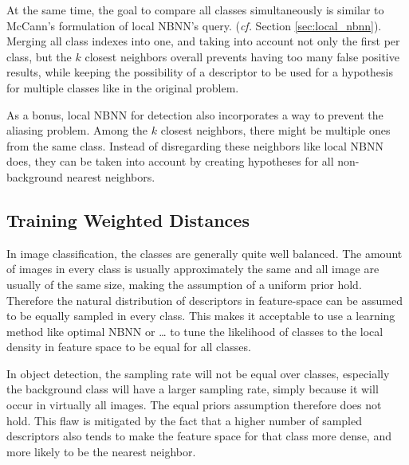 At the same time, the goal to compare all classes simultaneously is similar to McCann's formulation of local NBNN's query.\cite{mccann2012local} (\emph{cf.} Section \ref{sec:local_nbnn}). Merging all class indexes into one, and taking into account not only the first per class, but the $k$ closest neighbors overall prevents having too many false positive results, while keeping the possibility of a descriptor to be used for a hypothesis for multiple classes like in the original problem.

As a bonus, local NBNN for detection also incorporates a way to prevent the aliasing problem. Among the $k$ closest neighbors, there might be multiple ones from the same class. Instead of disregarding these neighbors like local NBNN does, they can be taken into account by creating hypotheses for all non-background nearest neighbors.


\begin{figure}[hbt]
    \centering
\end{figure}


\subsection{Training Weighted Distances} %
\label{sec:training_weighted_distances}

In image classification, the classes are generally quite well balanced. The amount of images in every class is usually approximately the same and all image are usually of the same size, making the assumption of a uniform prior hold. Therefore the natural distribution of descriptors in feature-space can be assumed to be equally sampled in every class. This makes it acceptable to use a learning method like optimal NBNN\cite{behmo2010towards} or \ldots {}\cite{wang2011improved} to tune the likelihood of classes to the local density in feature space to be equal for all classes.

In object detection, the sampling rate will not be equal over classes, especially the background class will have a larger sampling rate, simply because it will occur in virtually all images. The equal priors assumption therefore does not hold. This flaw is mitigated by the fact that a higher number of sampled descriptors also tends to make the feature space for that class more dense, and more likely to be the nearest neighbor.

